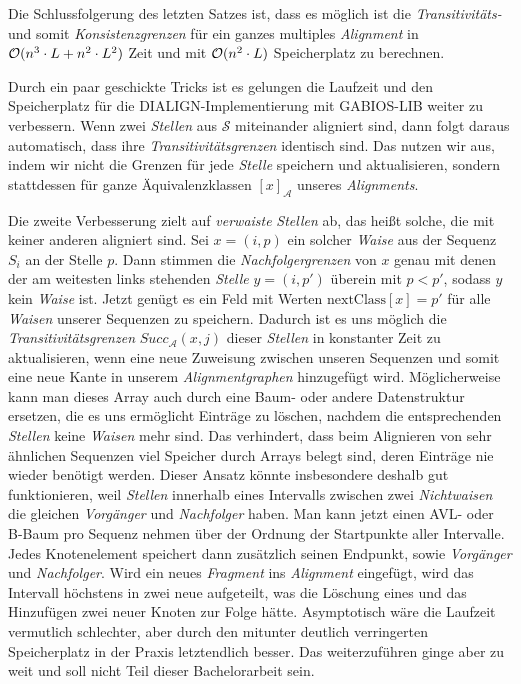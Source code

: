 Die Schlussfolgerung des letzten Satzes ist, dass es möglich ist die \emph{Transitivitäts-} und somit \emph{Konsistenzgrenzen} für ein ganzes multiples \emph{Alignment} in $\mathcal{O}(n^3\cdot L + n^2\cdot L^2)$ Zeit und mit $\mathcal{O}(n^2\cdot L)$ Speicherplatz zu berechnen. 

Durch ein paar geschickte Tricks ist es \cite{am00} gelungen die Laufzeit und den Speicherplatz für die DIALIGN-Implementierung mit GABIOS-LIB weiter zu verbessern. Wenn zwei \emph{Stellen} aus $\mathcal{S}$ miteinander aligniert sind, dann folgt daraus automatisch, dass ihre \emph{Transitivitätsgrenzen} identisch sind. Das nutzen wir aus, indem wir nicht die Grenzen für jede \emph{Stelle} speichern und aktualisieren, sondern stattdessen für ganze Äquivalenzklassen $[x]_{\mathcal{A}}$ unseres \emph{Alignments}.

Die zweite Verbesserung zielt auf \emph{verwaiste} \emph{Stellen} ab, das heißt solche, die mit keiner anderen aligniert sind. Sei $x = (i,p)$ ein solcher \emph{Waise} aus der Sequenz $S_i$ an der Stelle $p$. Dann stimmen die \emph{Nachfolgergrenzen} von $x$ genau mit denen der am weitesten links stehenden \emph{Stelle} $y = (i,p')$ überein mit $p < p'$, sodass $y$ kein \emph{Waise} ist. 
Jetzt genügt es ein Feld mit Werten $\text{nextClass}[x] = p'$ für alle \emph{Waisen} unserer Sequenzen zu speichern. Dadurch ist es uns möglich die \emph{Transitivitätsgrenzen} $Succ_{\mathcal{A}}(x,j)$ dieser \emph{Stellen} in konstanter Zeit zu aktualisieren, wenn eine neue Zuweisung zwischen unseren Sequenzen und somit eine neue Kante in unserem \emph{Alignmentgraphen} hinzugefügt wird. Möglicherweise kann man dieses Array auch durch eine Baum- oder andere Datenstruktur ersetzen, die es uns ermöglicht Einträge zu löschen, nachdem die entsprechenden \emph{Stellen} keine \emph{Waisen} mehr sind. Das verhindert, dass beim Alignieren von sehr ähnlichen Sequenzen viel Speicher durch Arrays belegt sind, deren Einträge nie wieder benötigt werden. Dieser Ansatz könnte insbesondere deshalb gut funktionieren, weil \emph{Stellen} innerhalb eines Intervalls zwischen zwei \emph{Nichtwaisen} die gleichen \emph{Vorgänger} und \emph{Nachfolger} haben. Man kann jetzt einen AVL- oder B-Baum pro Sequenz nehmen über der Ordnung der Startpunkte aller Intervalle. Jedes Knotenelement speichert dann zusätzlich seinen Endpunkt, sowie \emph{Vorgänger} und \emph{Nachfolger}. Wird ein neues \emph{Fragment} ins \emph{Alignment} eingefügt, wird das Intervall höchstens in zwei neue aufgeteilt, was die Löschung eines und das Hinzufügen zwei neuer Knoten zur Folge hätte. Asymptotisch wäre die Laufzeit vermutlich schlechter, aber durch den mitunter deutlich verringerten Speicherplatz in der Praxis letztendlich besser. Das weiterzuführen ginge aber zu weit und soll nicht Teil dieser Bachelorarbeit sein.

